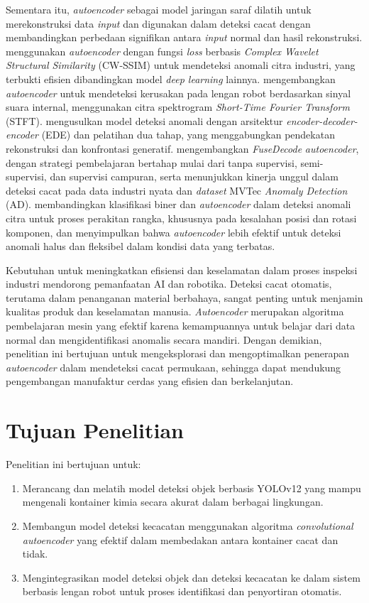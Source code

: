 Sementara itu, \textit{autoencoder} sebagai model jaringan saraf
dilatih untuk merekonstruksi data \textit{input} dan digunakan
dalam deteksi cacat dengan membandingkan perbedaan signifikan antara
\textit{input} normal dan hasil rekonstruksi.
\citet{14} menggunakan \textit{autoencoder} dengan
fungsi \textit{loss} berbasis \textit{Complex Wavelet Structural
Similarity} (CW-SSIM) untuk mendeteksi anomali citra industri, yang
terbukti efisien dibandingkan model \textit{deep learning} lainnya.
\citet{15} mengembangkan \textit{autoencoder} untuk mendeteksi kerusakan
pada lengan robot berdasarkan sinyal suara internal, menggunakan
citra spektrogram \textit{Short-Time Fourier Transform}
(STFT). \citet{16} mengusulkan model
deteksi anomali dengan arsitektur \textit{encoder-decoder-encoder}
(EDE) dan pelatihan dua tahap, yang
menggabungkan pendekatan rekonstruksi dan konfrontasi generatif.
\citet{17} mengembangkan \textit{FuseDecode} \textit{autoencoder},
dengan strategi pembelajaran bertahap mulai dari tanpa supervisi,
semi-supervisi, dan supervisi campuran, serta menunjukkan kinerja unggul
dalam deteksi cacat pada data industri nyata dan \textit{dataset}
MVTec \textit{Anomaly Detection} (AD). \citet{18} membandingkan
klasifikasi biner dan \textit{autoencoder} dalam deteksi anomali
citra untuk proses perakitan rangka, khususnya pada kesalahan posisi
dan rotasi komponen, dan menyimpulkan bahwa \textit{autoencoder}
lebih efektif untuk deteksi anomali halus dan fleksibel dalam kondisi
data yang terbatas.

Kebutuhan untuk meningkatkan efisiensi dan keselamatan dalam proses inspeksi
industri mendorong pemanfaatan AI dan robotika. Deteksi cacat
otomatis, terutama dalam penanganan material berbahaya, sangat
penting untuk menjamin kualitas produk dan keselamatan manusia.
\textit{Autoencoder} merupakan algoritma pembelajaran mesin yang
efektif karena kemampuannya untuk belajar dari data normal dan
mengidentifikasi anomalis secara mandiri.
Dengan demikian, penelitian ini bertujuan untuk mengeksplorasi dan
mengoptimalkan penerapan \textit{autoencoder} dalam mendeteksi cacat
permukaan, sehingga dapat mendukung pengembangan manufaktur
cerdas yang efisien dan berkelanjutan.

\vspace{1em}

\section{Tujuan Penelitian}
\noindent
Penelitian ini bertujuan untuk:
\begin{enumerate}
  \item Merancang dan melatih model deteksi objek berbasis YOLOv12 yang
    mampu mengenali kontainer kimia secara akurat dalam berbagai lingkungan.
  \item Membangun model deteksi kecacatan menggunakan algoritma
    \textit{convolutional autoencoder} yang efektif dalam membedakan
    antara kontainer cacat dan tidak.
  \item Mengintegrasikan model deteksi objek dan deteksi kecacatan ke
    dalam sistem berbasis lengan robot untuk proses identifikasi dan
    penyortiran otomatis.
\end{enumerate}

